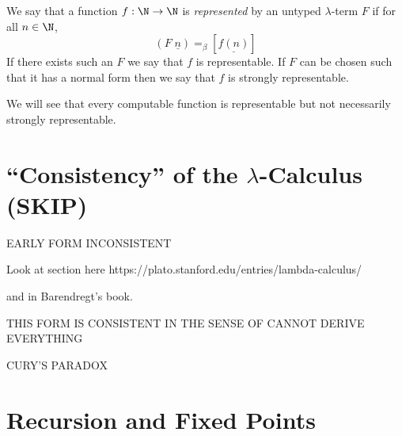 \documentclass[12pt]{article}
\begin{document}
\begin{defn}
We say that a function $f : \N \to \N$ is \textit{represented} by an untyped $\lambda$-term $F$ if for all $n \in \N$,
\[ (F \; \underline{n}) =_{\beta} [\underline{f(n)}] \]
If there exists such an $F$ we say that $f$ is representable. If $F$ can be chosen such that it has a normal form then we say that $f$ is strongly representable.
\end{defn}

\begin{rmk}
We will see that every computable function is representable but not necessarily strongly representable. 
\end{rmk}

\section{``Consistency'' of the $\lambda$-Calculus (SKIP)}

EARLY FORM INCONSISTENT

Look at section here https://plato.stanford.edu/entries/lambda-calculus/

and in Barendregt's book. 

THIS FORM IS CONSISTENT IN THE SENSE OF CANNOT DERIVE EVERYTHING

CURY'S PARADOX

\section{Recursion and Fixed Points}
\end{document}
